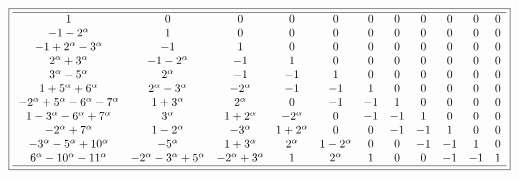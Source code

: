 \documentclass[10pt,reqno]{amsart}
\numberwithin{figure}{section}
\numberwithin{table}{section}
\theoremstyle{plain}
\numberwithin{theorem}{section}
\theoremstyle{remark}
\begin{document}
\begin{figure}[ht!]

\begin{minipage}{\linewidth} 
\begin{center} 
\tiny
\begin{equation*} 
\boxed{ 
\begin{array}{cccccccccccccccccc} \hline 
 1 & 0 & 0 & 0 & 0 & 0 & 0 & 0 & 0 & 0 & 0 \\
 -1-2^{\alpha } & 1 & 0 & 0 & 0 & 0 & 0 & 0 & 0 & 0 & 0 \\
 -1+2^{\alpha }-3^{\alpha } & -1 & 1 & 0 & 0 & 0 & 0 & 0 & 0 & 0 & 0 \\
 2^{\alpha }+3^{\alpha } & -1-2^{\alpha } & -1 & 1 & 0 & 0 & 0 & 0 & 0 & 0 & 0 \\
 3^{\alpha }-5^{\alpha } & 2^{\alpha } & -1 & -1 & 1 & 0 & 0 & 0 & 0 & 0 & 0 \\
 1+5^{\alpha }+6^{\alpha } & 2^{\alpha }-3^{\alpha } & -2^{\alpha } & -1 & -1 & 1 & 0 & 0 & 0 & 0 & 0 \\
 -2^{\alpha }+5^{\alpha }-6^{\alpha }-7^{\alpha } & 1+3^{\alpha } & 2^{\alpha } & 0 & -1 & -1 & 1 & 0 & 0 & 0 & 0 \\
 1-3^{\alpha }-6^{\alpha }+7^{\alpha } & 3^{\alpha } & 1+2^{\alpha } & -2^{\alpha } & 0 & -1 & -1 & 1 & 0 & 0 & 0 \\
 -2^{\alpha }+7^{\alpha } & 1-2^{\alpha } & -3^{\alpha } & 1+2^{\alpha } & 0 & 0 & -1 & -1 & 1 & 0 & 0 \\
 -3^{\alpha }-5^{\alpha }+10^{\alpha } & -5^{\alpha } & 1+3^{\alpha } & 2^{\alpha } & 1-2^{\alpha } & 0 & 0 & -1 & -1 & 1 & 0 \\
 6^{\alpha }-10^{\alpha }-11^{\alpha } & -2^{\alpha }-3^{\alpha }+5^{\alpha } & -2^{\alpha }+3^{\alpha } & 1 & 2^{\alpha } & 1 & 0 & 0 & -1 & -1 & 1 \\
 \hline
\end{array}
}
\end{equation*}
\end{center} 
\end{minipage} 


\end{figure}
\end{document}
